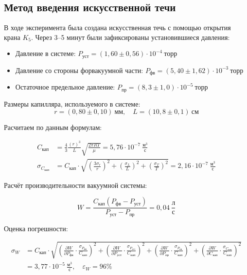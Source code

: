 \documentclass[a4paper,12pt]{article}
\begin{document}
   \subsection{Метод введения искусственной течи}

    В ходе эксперимента была создана искусственная течь с помощью открытия крана $K_5$. Через 3--5 минут были зафиксированы установившиеся давления:
    
    \begin{itemize}
        \item Давление в системе: $P_{\text{уст}} = (1{,}60 \pm 0{,}56) \cdot 10^{-4} \ \text{торр}$
        \item Давление со стороны форвакуумной части: $P_{\text{фв}} = (5{,}40 \pm 1{,}62) \cdot 10^{-3} \ \text{торр}$
        \item Остаточное предельное давление: $P_{\text{пр}} = (8{,}3 \pm 1{,}0) \cdot 10^{-5} \ \text{торр}$
    \end{itemize}
    
    Размеры капилляра, используемого в системе:
    \[
    r = (0{,}80 \pm 0{,}10) \ \text{мм}, \quad L = (10{,}8 \pm 0{,}1) \ \text{см}
    \]
    
    Расчитаем по данным формулам:
    
    \begin{align*}
    C_{\text{кап}} &= \frac{4}{3} \frac{(r)^3}{L} \sqrt{\frac{2\pi R T}{\mu}} = 5{,}76 \cdot 10^{-7} \ \frac{\text{м}^3}{\text{с}} \\
    \sigma_{C_{\text{кап}}} &= C_{\text{кап}} \cdot \sqrt{\left( \frac{3\sigma_r}{r} \right)^2 + \left( \frac{\sigma_L}{L} \right)^2 + \left( \frac{\sigma_T}{T} \right)^2} = 2{,}16 \cdot 10^{-7} \ \frac{\text{м}^3}{\text{с}}
    \end{align*}
    
    Расчёт производительности вакуумной системы:
    
    \[
    W = \frac{C_{\text{кап}}(P_{\text{фв}} - P_{\text{уст}})}{P_{\text{уст}} - P_{\text{пр}}} = 0{,}04 \ \frac{\text{л}}{\text{с}}
    \]
    
    Оценка погрешности:
    
    \begin{align*}
    \sigma_W &= C_{\text{кап}} \cdot \sqrt{
    \left( \frac{\partial W}{\partial P_{\text{фв}}} \cdot \frac{\sigma_{P_{\text{фв}}}}{C_{\text{кап}}} \right)^2 +
    \left( \frac{\partial W}{\partial P_{\text{уст}}} \cdot \frac{\sigma_{P_{\text{уст}}}}{C_{\text{кап}}} \right)^2 +
    \left( \frac{\partial W}{\partial P_{\text{пр}}} \cdot \frac{\sigma_{P_{\text{пр}}}}{C_{\text{кап}}} \right)^2 +
    \left( \frac{\partial W}{\partial C_{\text{кап}}} \cdot \frac{\sigma_{C_{\text{кап}}}}{C_{\text{кап}}} \right)^2 } \\
    &= 3{,}77 \cdot 10^{-5} \ \frac{\text{м}^3}{\text{с}}, \quad \varepsilon_W = 96\%
    \end{align*}
    
\end{document}
